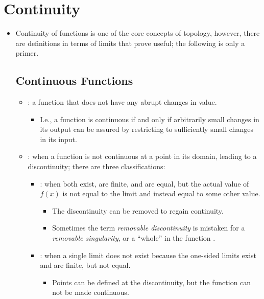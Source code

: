\section{Continuity}
\begin{itemize}
  \item Continuity of functions is one of the core concepts of topology,
    however, there are definitions in terms of limits that prove useful; the
    following is only a primer.

  \subsection{Continuous Functions}
  \begin{itemize}
    \item {}: a function that does not have any abrupt
      changes in value.
    \begin{itemize}
      \item I.e., a function is continuous if and only if arbitrarily small
        changes in its output can be assured by restricting to sufficiently
        small changes in its input.
    \end{itemize}

  \item {}: when a function is not continuous at a point in its
    domain, leading to a discontinuity; there are three classifications:
    \begin{itemize}
      \item {}: when both  exist, are finite, and are equal, but the actual value of \(
        f(x) \) is not equal to the limit and instead equal to some other
        value.
        \begin{itemize}
          \item The discontinuity can be removed to regain continuity.
          \item Sometimes the term \textit{removable discontinuity} is mistaken
            for a \textit{removable singularity}, or a ``whole'' in the function
            .
        \end{itemize}
      \item {}: when a single limit does not exist because the one-sided
        limits exist and are finite, but not equal.
        \begin{itemize}
          \item Points can be defined at the discontinuity, but the function
            can not be made continuous.
        \end{itemize}


\end{itemize}
\end{itemize}
\end{itemize}
